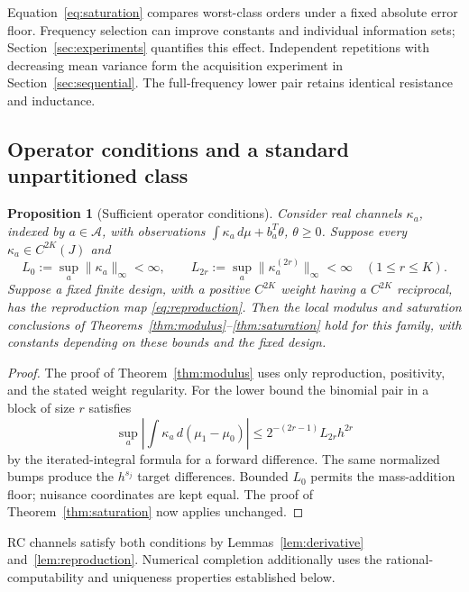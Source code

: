 \documentclass[10pt]{amsart}
\newtheorem{proposition}[theorem]{Proposition}
\theoremstyle{definition}
\theoremstyle{remark}
\newcommand{\dd}{\,d}
\begin{document}
Equation~\eqref{eq:saturation} compares worst-class orders under a fixed absolute error floor. Frequency selection can improve constants and individual information sets; Section~\ref{sec:experiments} quantifies this effect. Independent repetitions with decreasing mean variance form the acquisition experiment in Section~\ref{sec:sequential}. The full-frequency lower pair retains identical resistance and inductance.

\subsection{Operator conditions and a standard unpartitioned class}
\begin{proposition}[Sufficient operator conditions]\label{prop:operator}
Consider real channels $\kappa_a$, indexed by $a\in\mathcal A$, with observations $\int\kappa_a\dd\mu+b_a^T\theta$, $\theta\ge0$. Suppose every $\kappa_a\in C^{2K}(J)$ and
\[
 L_0:=\sup_a\|\kappa_a\|_\infty<\infty,\qquad
 L_{2r}:=\sup_a\|\kappa_a^{(2r)}\|_\infty<\infty\quad(1\le r\le K).
\]
Suppose a fixed finite design, with a positive $C^{2K}$ weight having a $C^{2K}$ reciprocal, has the reproduction map \eqref{eq:reproduction}. Then the local modulus and saturation conclusions of Theorems~\ref{thm:modulus}--\ref{thm:saturation} hold for this family, with constants depending on these bounds and the fixed design.
\end{proposition}
\begin{proof}
The proof of Theorem~\ref{thm:modulus} uses only reproduction, positivity, and the stated weight regularity. For the lower bound the binomial pair in a block of size $r$ satisfies
\[
 \sup_a\left|\int\kappa_a\dd(\mu_1-\mu_0)\right|
 \le 2^{-(2r-1)}L_{2r}h^{2r}
\]
by the iterated-integral formula for a forward difference. The same normalized bumps produce the $h^{s_j}$ target differences. Bounded $L_0$ permits the mass-addition floor; nuisance coordinates are kept equal. The proof of Theorem~\ref{thm:saturation} now applies unchanged.
\end{proof}
RC channels satisfy both conditions by Lemmas~\ref{lem:derivative} and~\ref{lem:reproduction}. Numerical completion additionally uses the rational-computability and uniqueness properties established below.
\end{document}
